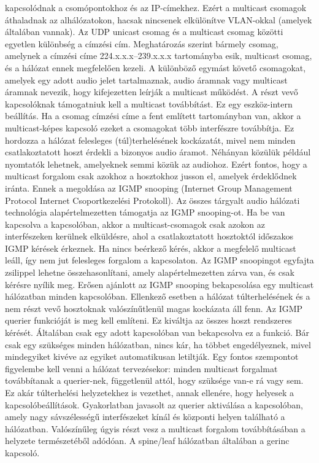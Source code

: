 kapcsolódnak a csomópontokhoz és az IP-címekhez. Ezért a multicast csomagok
áthaladnak az alhálózatokon, hacsak nincsenek elkülönítve VLAN-okkal (amelyek
általában vannak). Az UDP unicast csomag és a multicast csomag közötti egyetlen
különbség a címzési cím. Meghatározás szerint bármely csomag, amelynek a címzési
címe 224.x.x.x--239.x.x.x tartományba esik, multicast csomag, és a hálózat ennek
megfelelően kezeli. A különböző egymást követő csomagokat, amelyek egy adott
audio jelet tartalmaznak, audio áramnak vagy multicast áramnak nevezik, hogy
kifejezetten leírják a multicast működést. A részt vevő kapcsolóknak támogatniuk
kell a multicast továbbítást. Ez egy eszköz-intern beállítás. Ha a csomag
címzési címe a fent említett tartományban van, akkor a multicast-képes kapcsoló
ezeket a csomagokat több interfészre továbbítja. Ez hordozza a hálózat
felesleges (túl)terhelésének kockázatát, mivel nem minden csatlakoztatott hoszt
érdekli a bizonyos audio áramot. Néhányan közülük például nyomtatók lehetnek,
amelyeknek semmi közük az audiohoz. Ezért fontos, hogy a multicast forgalom csak
azokhoz a hosztokhoz jusson el, amelyek érdeklődnek iránta. Ennek a megoldása az
IGMP snooping (Internet Group Management Protocol Internet Csoportkezelési
Protokoll). Az összes tárgyalt audio hálózati technológia alapértelmezetten
támogatja az IGMP snooping-ot. Ha be van kapcsolva a kapcsolóban, akkor a
multicast-csomagok csak azokon az interfészeken kerülnek elküldésre, ahol a
csatlakoztatott hosztoktól időszakos IGMP kérések érkeznek. Ha nincs beérkező
kérés, akkor a megfelelő multicast leáll, így nem jut felesleges forgalom a
kapcsolaton. Az IGMP snoopingot egyfajta zsilippel lehetne összehasonlítani,
amely alapértelmezetten zárva van, és csak kérésre nyílik meg. Erősen ajánlott
az IGMP snooping bekapcsolása egy multicast hálózatban minden kapcsolóban.
Ellenkező esetben a hálózat túlterhelésének és a nem részt vevő hosztoknak
valószínűtlenül magas kockázata áll fenn. Az IGMP querier funkcióját is meg kell
említeni. Ez kiváltja az összes hoszt rendszeres kérését. Általában csak egy
adott kapcsolóban van bekapcsolva ez a funkció. Bár csak egy szükséges minden
hálózatban, nincs kár, ha többet engedélyeznek, mivel mindegyiket kivéve az
egyiket automatikusan letiltják. Egy fontos szempontot figyelembe kell venni a
hálózat tervezésekor: minden multicast forgalmat továbbítanak a querier-nek,
függetlenül attól, hogy szüksége van-e rá vagy sem. Ez akár túlterhelési
helyzetekhez is vezethet, annak ellenére, hogy helyesek a kapcsolóbeállítások.
Gyakorlatban javasolt az querier aktiválása a kapcsolóban, amely nagy
sávszélességű interfészeket kínál és központi helyen található a hálózatban.
Valószínűleg úgyis részt vesz a multicast forgalom továbbításában a helyzete
természetéből adódóan. A spine/leaf hálózatban általában a gerinc kapcsoló.


